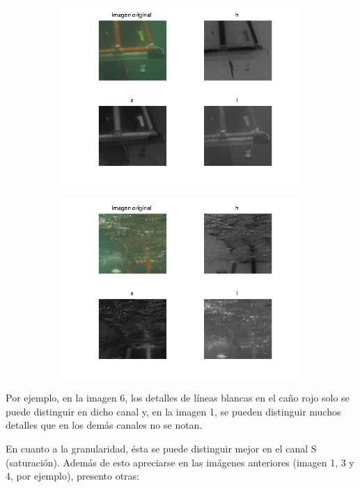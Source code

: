 \documentclass{article}
\begin{document}
\begin{figure}[H]
\begin{subfigure}{0.5\textwidth}
        \includegraphics[scale=0.6]{im8.png}
    \end{subfigure}\hfill
	\begin{subfigure}{0.5\textwidth}
	\centering
        \includegraphics[scale=0.6]{im9.png}
    \end{subfigure}\hfill
\end{figure}\hfill

Por ejemplo, en la imagen 6, los detalles de líneas blancas en el caño rojo solo se puede distinguir en dicho canal y, en la imagen 1, se pueden distinguir muchos detalles que en los demás canales no se notan. 

En cuanto a la granularidad, ésta se puede distinguir mejor en el canal S (saturación). Además de esto apreciarse en las imágenes anteriores (imagen 1, 3 y 4, por ejemplo), presento otras:
\end{document}
